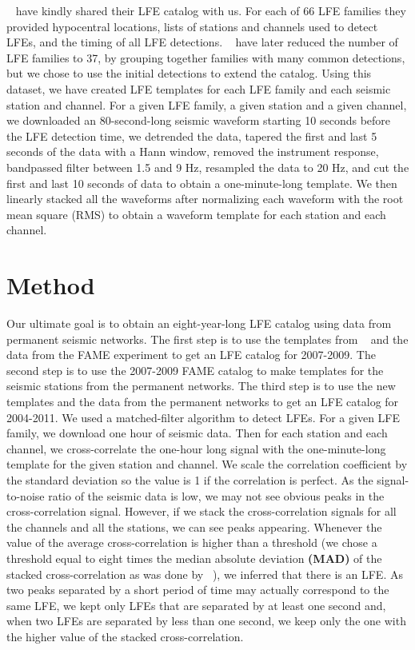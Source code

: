 \documentclass[draft]{agujournal2019}
\begin{document}
~ have kindly shared their LFE catalog with us. For each of 66 LFE families they provided hypocentral locations, lists of stations and channels used to detect LFEs, and the timing of all LFE detections. ~ have later reduced the number of LFE families to 37, by grouping together families with many common detections, but we chose to use the initial detections to extend the catalog. Using this dataset, we have created LFE templates for each LFE family and each seismic station and channel. For a given LFE family, a given station and a given channel, we downloaded an 80-second-long seismic waveform starting 10 seconds before the LFE detection time, we detrended the data, tapered the first and last 5 seconds of the data with a Hann window, removed the instrument response, bandpassed filter between 1.5 and 9 Hz, resampled the data to 20 Hz, and cut the first and last 10 seconds of data to obtain a one-minute-long template. We then linearly stacked all the waveforms after normalizing each waveform with the root mean square (RMS) to obtain a waveform template for each station and each channel.

\section{Method}

Our ultimate goal is to obtain an eight-year-long LFE catalog using data from permanent seismic networks. The first step is to use the templates from ~ and the data from the FAME experiment to get an LFE catalog for 2007-2009. The second step is to use the 2007-2009 FAME catalog to make templates for the seismic stations from the permanent networks. The third step is to use the new templates and the data from the permanent networks to get an LFE catalog for 2004-2011. We used a matched-filter algorithm to detect LFEs. For a given LFE family, we download one hour of seismic data. Then for each station and each channel, we cross-correlate the one-hour long signal with the one-minute-long template for the given station and channel. We scale the correlation coefficient by the standard deviation so the value is 1 if the correlation is perfect. As the signal-to-noise ratio of the seismic data is low, we may not see obvious peaks in the cross-correlation signal. However, if we stack the cross-correlation signals for all the channels and all the stations, we can see peaks appearing. Whenever the value of the average cross-correlation is higher than a threshold (we chose a threshold equal to eight times the median absolute deviation \textbf{(MAD)} of the stacked cross-correlation as was done by ~), we inferred that there is an LFE. As two peaks separated by a short period of time may actually correspond to the same LFE, we kept only LFEs that are separated by at least one second and, when two LFEs are separated by less than one second, we keep only the one with the higher value of the stacked cross-correlation. \\
\end{document}
